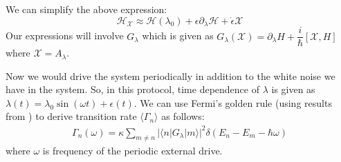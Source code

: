 \documentclass[11pt,a4paper]{article}
\begin{document}
We can simplify the above expression:
\begin{equation}
\mathcal{H}_{\mathcal{X}} \approx \mathcal{H} (\lambda_0)+ \epsilon \partial_{\lambda}\mathcal{H} + \dot{\epsilon} \mathcal{X}
\end{equation}
Our expressions will involve $G_{\lambda}$ which is given as $G_{\lambda}(\mathcal{X} )= \partial_{\lambda} H + \dfrac{i}{\hbar} [\mathcal{X}, H] $ where $\mathcal{X}=A_{\lambda}$.


Now we would drive the system periodically in addition to the white noise we have in the system. So, in this protocol, time dependence of $\lambda$ is given as $\lambda(t)= \lambda_0 \sin (\omega t) + \epsilon(t)$. We can use Fermi's golden rule (using results from \cite{clerk2010introduction}) to derive  transition rate $\langle \Gamma_n \rangle$ \cite{kolodrubetz2016geometry} as follows: 
\begin{align}
 \Gamma_n (\omega) = \kappa  \sum_{m \neq n} |\langle n | G_{\lambda} | m \rangle |^2 \delta(E_n-E_m- \hbar \omega)
\end{align}
where $\omega$ is frequency of the periodic external drive.
\end{document}
